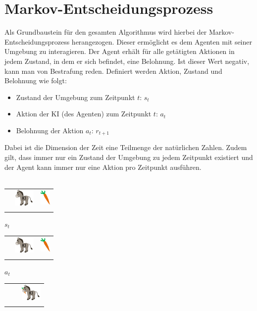 \documentclass[12pt,titlepage]{article}
\begin{document}
\section{Markov-Entscheidungsprozess}
Als Grundbaustein für den gesamten Algorithmus wird hierbei der Markov-Entscheidungsprozess herangezogen. Dieser ermöglicht es dem Agenten mit seiner Umgebung zu interagieren. Der Agent erhält für alle getätigten Aktionen in jedem Zustand, in dem er sich befindet, eine Belohnung. Ist dieser Wert negativ, kann man von Bestrafung reden. Definiert werden Aktion, Zustand und Belohnung wie folgt:
\begin{itemize}
\item Zustand der Umgebung zum Zeitpunkt $t$: $s_t$
\item Aktion der KI (des Agenten) zum Zeitpunkt $t$: $a_t$ 
\item Belohnung der Aktion $a_t$: $r_{t+1}$ 
\end{itemize}
Dabei ist die Dimension der Zeit eine Teilmenge der natürlichen Zahlen. Zudem gilt, dass immer nur ein Zustand der Umgebung zu jedem Zeitpunkt existiert und der Agent kann immer nur eine Aktion pro Zeitpunkt ausführen. 
\\\\
\begin{tabular}{c|p{1cm}|p{1cm}}
&&\\
\hline
& \includegraphics[width=1cm]{AI.png} & \includegraphics[width=0.5cm]{Target.png}\\
\hline
&&
\end{tabular}
$s_t$ \begin{tabular}{c|p{1cm}|p{1cm}}
&&\\
\hline
& \includegraphics[width=1cm]{AI.png} & \includegraphics[width=0.5cm]{Target.png}\\
\hline
&&
\end{tabular}
$a_t$ \begin{tabular}{c|p{1cm}|p{1cm}}
&&\\
\hline
&& \includegraphics[width=1cm]{Reward.png}\\
\hline
&&
\end{tabular}
\end{document}
